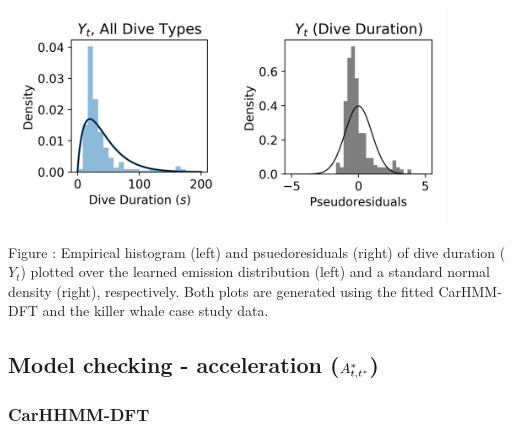 \documentclass{article}
\begin{document}
        \begin{center}
        \includegraphics[width=2.25in]{../Plots/CarHMM_empirical_hist_dive_duration.png}
        \includegraphics[width=2.25in]{../Plots/CarHMM_psedoresids_Dive_Duration.png}
        \end{center}
        
        \noindent Figure : Empirical histogram (left) and psuedoresiduals (right) of dive duration ($Y_{t}$) plotted over the learned emission distribution (left) and a standard normal density (right), respectively. Both plots are generated using the fitted CarHMM-DFT and the killer whale case study data.
        \addtocounter{fignum}{1}
        
    \newpage
    \subsection{Model checking - acceleration ($A^*_{t,t^*}$)}
        
        \subsubsection{CarHHMM-DFT}
        
\end{document}
